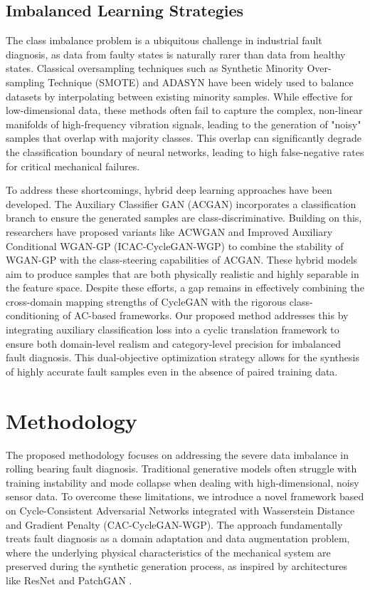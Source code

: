 \documentclass[twocolumn]{IEEEtran}
\begin{document}
\subsection{Imbalanced Learning Strategies}
The class imbalance problem is a ubiquitous challenge in industrial fault diagnosis, as data from faulty states is naturally rarer than data from healthy states. Classical oversampling techniques such as Synthetic Minority Over-sampling Technique (SMOTE) \cite{6} and ADASYN \cite{35} have been widely used to balance datasets by interpolating between existing minority samples. While effective for low-dimensional data, these methods often fail to capture the complex, non-linear manifolds of high-frequency vibration signals, leading to the generation of "noisy" samples that overlap with majority classes. This overlap can significantly degrade the classification boundary of neural networks, leading to high false-negative rates for critical mechanical failures.

To address these shortcomings, hybrid deep learning approaches have been developed. The Auxiliary Classifier GAN (ACGAN) \cite{5} incorporates a classification branch to ensure the generated samples are class-discriminative. Building on this, researchers have proposed variants like ACWGAN \cite{35} and Improved Auxiliary Conditional WGAN-GP (ICAC-CycleGAN-WGP) \cite{26} to combine the stability of WGAN-GP with the class-steering capabilities of ACGAN. These hybrid models aim to produce samples that are both physically realistic and highly separable in the feature space. Despite these efforts, a gap remains in effectively combining the cross-domain mapping strengths of CycleGAN with the rigorous class-conditioning of AC-based frameworks. Our proposed method addresses this by integrating auxiliary classification loss into a cyclic translation framework to ensure both domain-level realism and category-level precision for imbalanced fault diagnosis. This dual-objective optimization strategy allows for the synthesis of highly accurate fault samples even in the absence of paired training data.


\section{Methodology}
\label{sec:methodology}

The proposed methodology focuses on addressing the severe data imbalance in rolling bearing fault diagnosis. Traditional generative models often struggle with training instability and mode collapse when dealing with high-dimensional, noisy sensor data. To overcome these limitations, we introduce a novel framework based on Cycle-Consistent Adversarial Networks integrated with Wasserstein Distance and Gradient Penalty (CAC-CycleGAN-WGP). The approach fundamentally treats fault diagnosis as a domain adaptation and data augmentation problem, where the underlying physical characteristics of the mechanical system are preserved during the synthetic generation process, as inspired by architectures like ResNet \cite{He2016} and PatchGAN \cite{Isola2017}.
\end{document}
